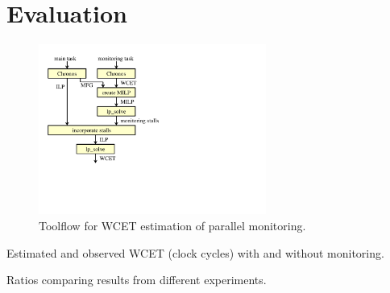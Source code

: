 \section{Evaluation}
\label{sec:monitoring_wcet.evaluation}

\begin{figure}%
  \begin{center}
    \vspace{-0.1in}
    \includegraphics[height=2.2in]{monitoring_wcet/figs/toolflow.pdf}
    \vspace{-0.1in}
    \caption{Toolflow for WCET estimation of parallel monitoring.}
    \label{fig:evaluation.toolflow}
    \vspace{-0.3in}
  \end{center}
\end{figure}

\begin{table}[htb]
  \begin{center}
    \begin{scriptsize}
    
    \end{scriptsize}
    \vspace{-0.1in}
    \caption{Estimated and observed WCET (clock cycles) with and without monitoring.}
    \label{tab:evaluation.wcet}
    \vspace{-0.2in}
  \end{center}
\end{table}

\begin{table}[htb]
  \begin{center}
    \begin{tiny}
    
    \end{tiny}
    \vspace{-0.1in}
    \caption{Ratios comparing results from different experiments.} \label{tab:evaluation.ratios}
    \vspace{-0.3in}
  \end{center}
\end{table}

